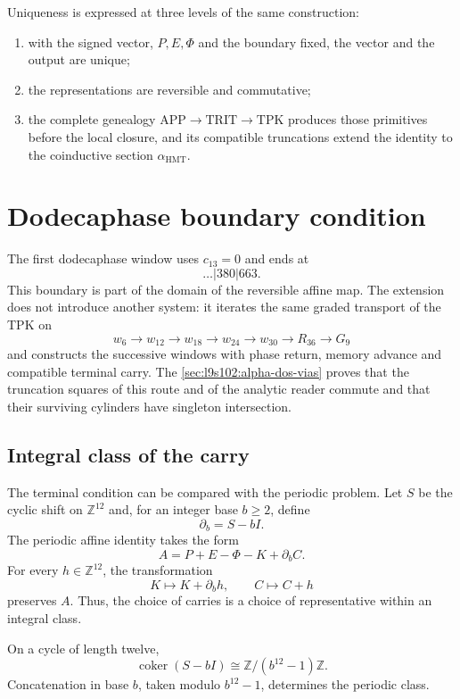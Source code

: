 Uniqueness is expressed at three levels of the same construction:
\begin{enumerate}
  \item with the signed vector, \(P,E,\Phi\) and the boundary fixed, the vector and the
  output are unique;
  \item the representations are reversible and commutative;
  \item the complete genealogy
  \(\mathrm{APP}\to\mathrm{TRIT}\to\mathrm{TPK}\) produces those primitives
  before the local closure, and its compatible truncations extend the
  identity to the coinductive section \(\alpha_{\mathrm{HMT}}\).
\end{enumerate}

\section{Dodecaphase boundary condition}

The first dodecaphase window uses \(c_{13}=0\) and ends at
\[
\ldots|380|663.
\]
This boundary is part of the domain of the reversible affine map. The
extension does not introduce another system: it iterates the same graded transport
of the TPK on
\[
 w_6\to w_{12}\to w_{18}\to w_{24}\to w_{30}\to R_{36}\to G_9
\]
and constructs the successive windows with phase return, memory advance and
compatible terminal carry. The
\cref{sec:l9s102:alpha-dos-vias} proves that the truncation squares
of this route and of the analytic reader commute and that their surviving
cylinders have singleton intersection.

\subsection{Integral class of the carry}

The terminal condition can be compared with the periodic problem. Let
\(S\) be the cyclic shift on \(\mathbb Z^{12}\) and, for an integer
base \(b\geq2\), define
\[
 \partial_b=S-bI.
\]
The periodic affine identity takes the form
\[
 A=P+E-\Phi-K+\partial_bC.
\]
For every \(h\in\mathbb Z^{12}\), the transformation
\[
 K\longmapsto K+\partial_bh,
 \qquad
 C\longmapsto C+h
\]
preserves \(A\). Thus, the choice of carries is a choice of
representative within an integral class.

\begin{proposition}
\label{prop:cociente-periodico-acarreo}
On a cycle of length twelve,
\[
 \operatorname{coker}(S-bI)\cong
 \mathbb Z/(b^{12}-1)\mathbb Z.
\]
Concatenation in base \(b\), taken modulo \(b^{12}-1\), determines the
periodic class.
\end{proposition}

